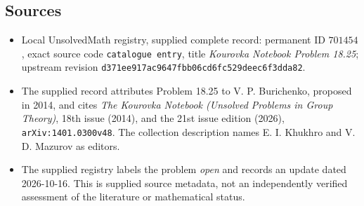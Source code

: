 \documentclass[11pt]{article}
\begin{document}
\subsection{Sources}
\begin{itemize}
\item Local UnsolvedMath registry, supplied complete record: permanent ID \(701454\), exact source code \texttt{catalogue entry}, title \emph{Kourovka Notebook Problem 18.25}; upstream revision \texttt{d371ee917ac9647fbb06cd6fc529deec6f3dda82}.
\item The supplied record attributes Problem 18.25 to V. P. Burichenko, proposed in 2014, and cites \emph{The Kourovka Notebook (Unsolved Problems in Group Theory)}, 18th issue (2014), and the 21st issue edition (2026), \texttt{arXiv:1401.0300v48}. The collection description names E. I. Khukhro and V. D. Mazurov as editors.
\item The supplied registry labels the problem \emph{open} and records an update dated 2026-10-16. This is supplied source metadata, not an independently verified assessment of the literature or mathematical status.
\end{itemize}
\end{document}
